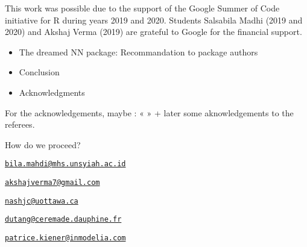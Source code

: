 This work was possible due to the support of the Google Summer of Code
initiative for R during years 2019 and 2020. Students Salsabila Madhi
(2019 and 2020) and Akshaj Verma (2019) are grateful to Google for the
financial support.



\begin{itemize}
\tightlist
\item
  The dreamed NN package: Recommandation to package authors
\item
  Conclusion
\item
  Acknowledgments
\end{itemize}

For the acknowledgements, maybe : « » + later some aknowledgements to
the referees.

How do we proceed?


\address{%
Salsabila Mahdi\\
Universitas Syiah Kuala\\
JL. Syech Abdurrauf No.3, Aceh 23111, Indonesia\\
}
\href{mailto:bila.mahdi@mhs.unsyiah.ac.id}{\nolinkurl{bila.mahdi@mhs.unsyiah.ac.id}}

\address{%
Akshaj Verma\\
Affiliation\\
line 1\\ line 2\\
}
\href{mailto:akshajverma7@gmail.com}{\nolinkurl{akshajverma7@gmail.com}}

\address{%
John C. Nash\\
Affiliation\\
line 1\\ line 2\\
}
\href{mailto:nashjc@uottawa.ca}{\nolinkurl{nashjc@uottawa.ca}}

\address{%
Christophe Dutang\\
Univ. Paris-Dauphine, Univ. PSL, CNRS, CEREMADE\\
Place du Ml de Lattre de Tassigny, 75016 Paris, France\\
}
\href{mailto:dutang@ceremade.dauphine.fr}{\nolinkurl{dutang@ceremade.dauphine.fr}}

\address{%
Patrice Kiener\\
InModelia\\
5 rue Malebranche, 75005 Paris, France\\
}
\href{mailto:patrice.kiener@inmodelia.com}{\nolinkurl{patrice.kiener@inmodelia.com}}

